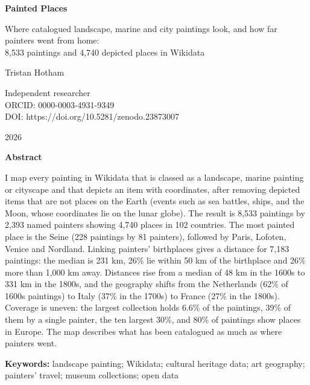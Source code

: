 \documentclass[11pt,a4paper]{article}
\begin{document}
\begin{center}
{\Large\bfseries Painted Places\par}
\vspace{0.4em}
{\large Where catalogued landscape, marine and city paintings look, and how far painters went from home:\\8,533 paintings and 4,740 depicted places in Wikidata\par}
\vspace{1.2em}
{\large Tristan Hotham\par}
\vspace{0.3em}
{\small Independent researcher\\
ORCID: 0000-0003-4931-9349\\
DOI: https://doi.org/10.5281/zenodo.23873007\par}
\vspace{0.8em}
2026
\end{center}

\begin{center}\textbf{Abstract}\end{center}
I map every painting in Wikidata that is classed as a landscape, marine painting or cityscape and that depicts an item with coordinates, after removing depicted items that are not places on the Earth (events such as sea battles, ships, and the Moon, whose coordinates lie on the lunar globe). The result is 8,533 paintings by 2,393 named painters showing 4,740 places in 102 countries. The most painted place is the Seine (228 paintings by 81 painters), followed by Paris, Lofoten, Venice and Nordland. Linking painters' birthplaces gives a distance for 7,183 paintings: the median is 231 km, 26\% lie within 50 km of the birthplace and 26\% more than 1,000 km away. Distances rise from a median of 48 km in the 1600s to 331 km in the 1800s, and the geography shifts from the Netherlands (62\% of 1600s paintings) to Italy (37\% in the 1700s) to France (27\% in the 1800s). Coverage is uneven: the largest collection holds 6.6\% of the paintings, 39\% of them by a single painter, the ten largest 30\%, and 80\% of paintings show places in Europe. The map describes what has been catalogued as much as where painters went.

\textbf{Keywords:} landscape painting; Wikidata; cultural heritage data; art geography; painters' travel; museum collections; open data
\end{document}
